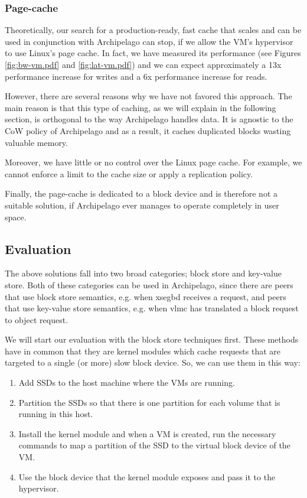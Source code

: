 \subsubsection{Page-cache}

Theoretically, our search for a production-ready, fast cache that scales and 
can be used in conjunction with Archipelago can stop, if we allow the VM's 
hypervisor to use Linux's page cache. In fact, we have measured its performance 
(see Figures \ref{fig:bw-vm.pdf} and \ref{fig:lat-vm.pdf}) and we can expect 
approximately a 13x performance increase for writes and a 6x performance 
increase for reads.

However, there are several reasons why we have not favored this approach. The 
main reason is that this type of caching, as we will explain in the following 
section, is orthogonal to the way Archipelago handles data. It is agnostic to 
the CoW policy of Archipelago and as a result, it caches duplicated blocks 
wasting valuable memory.

Moreover, we have little or no control over the Linux page cache. For example, 
we cannot enforce a limit to the cache size or apply a replication policy.

Finally, the page-cache is dedicated to a block device and is therefore not a
suitable solution, if Archipelago ever manages to operate completely in user 
space.

\subsection{Evaluation}

The above solutions fall into two broad categories; block store and key-value 
store. Both of these categories can be used in Archipelago, since there are 
peers that use block store semantics, e.g.  when xsegbd receives a request, and 
peers that use key-value store semantics, e.g.  when vlmc has translated a 
block request to object request.

We will start our evaluation with the block store techniques first. These 
methods have in common that they are kernel modules which cache requests that 
are targeted to a single (or more) slow block device. So, we can use them in 
this way:

\begin{enumerate}
	\item Add SSDs to the host machine where the VMs are running.
	\item Partition the SSDs so that there is one partition for each volume 
		that is running in this host.
	\item Install the kernel module and when a VM is created, run the necessary 
		commands to map a partition of the SSD to the virtual block device of 
		the VM.
	\item Use the block device that the kernel module exposes and pass it to 
		the hypervisor.
\end{enumerate}


